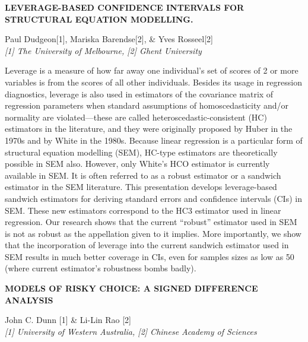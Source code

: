 \documentclass[]{article}
\begin{document}
\textbf{LEVERAGE-BASED CONFIDENCE INTERVALS FOR STRUCTURAL EQUATION
MODELLING.}

Paul Dudgeon{[}1{]}, Mariska Barendse{[}2{]}, \& Yves Rosseel{[}2{]}\\
\emph{{[}1{]} The University of Melbourne, {[}2{]} Ghent University}

Leverage is a measure of how far away one individual's set of scores of
2 or more variables is from the scores of all other individuals. Besides
its usage in regression diagnostics, leverage is also used in estimators
of the covariance matrix of regression parameters when standard
assumptions of homoscedasticity and/or normality are violated---these
are called heteroscedastic-consistent (HC) estimators in the literature,
and they were originally proposed by Huber in the 1970s and by White in
the 1980s. Because linear regression is a particular form of structural
equation modelling (SEM), HC-type estimators are theoretically possible
in SEM also. However, only White's HCO estimator is currently available
in SEM. It is often referred to as a robust estimator or a sandwich
estimator in the SEM literature. This presentation develops
leverage-based sandwich estimators for deriving standard errors and
confidence intervals (CIs) in SEM. These new estimators correspond to
the HC3 estimator used in linear regression. Our research shows that the
current ``robust'' estimator used in SEM is not as robust as the
appellation given to it implies. More importantly, we show that the
incorporation of leverage into the current sandwich estimator used in
SEM results in much better coverage in CIs, even for samples sizes as
low as 50 (where current estimator's robustness bombs badly).\\
\pagebreak  

\textbf{MODELS OF RISKY CHOICE: A SIGNED DIFFERENCE ANALYSIS}

John C. Dunn {[}1{]} \& Li-Lin Rao {[}2{]}\\
\emph{{[}1{]} University of Western Australia, {[}2{]} Chinese Academy
of Sciences}
\end{document}
